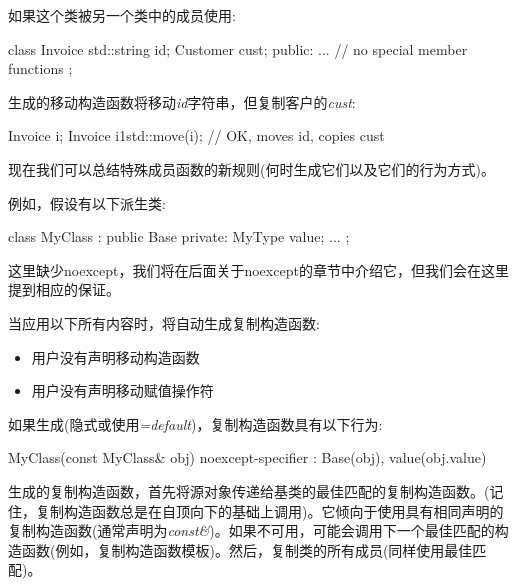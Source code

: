 如果这个类被另一个类中的成员使用:\par

\begin{codebox}[cpp]
class Invoice {
  std::string id;
  Customer cust;
public:
  ... // no special member functions
};
\end{codebox}

生成的移动构造函数将移动\textit{id}字符串，但复制客户的\textit{cust}:\par

\begin{codebox}[cpp]
Invoice i;
Invoice i1{std::move(i)}; // OK, moves id, copies cust
\end{codebox}


现在我们可以总结特殊成员函数的新规则(何时生成它们以及它们的行为方式)。\par

例如，假设有以下派生类:\par

\begin{codebox}[cpp]
class MyClass : public Base
{
private:
  MyType value;
  ...
};
\end{codebox}

这里缺少noexcept，我们将在后面关于noexcept的章节中介绍它，但我们会在这里提到相应的保证。\par


当应用以下所有内容时，将自动生成复制构造函数:\par

\begin{itemize}
  \item 用户没有声明移动构造函数
  \item 用户没有声明移动赋值操作符
\end{itemize}

如果生成(隐式或使用\textit{=default})，复制构造函数具有以下行为:\par

\begin{codebox}[cpp]
MyClass(const MyClass& obj) noexcept-specifier
: Base(obj), value(obj.value) {
}
\end{codebox}

生成的复制构造函数，首先将源对象传递给基类的最佳匹配的复制构造函数。(记住，复制构造函数总是在自顶向下的基础上调用)。它倾向于使用具有相同声明的复制构造函数(通常声明为\textit{const\&})。如果不可用，可能会调用下一个最佳匹配的构造函数(例如，复制构造函数模板)。然后，复制类的所有成员(同样使用最佳匹配)。\par


